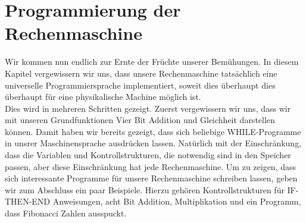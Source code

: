 \documentclass[11pt,a4paper,leqno]{report}
\numberwithin{equation}{chapter}
\begin{document}
\chapter{Programmierung der Rechenmaschine}
Wir kommen nun endlich zur Ernte der Früchte unserer Bemühungen. In diesem Kapitel vergewissern wir uns, dass unsere Rechenmaschine tats\"achlich eine universelle Programmiersprache implementiert, soweit dies \"uberhaupt dies \"uberhaupt f\"ur eine physikalische Machine m\"oglich ist.\\
Dies wird in mehreren Schritten gezeigt. Zuerst vergewissern wir uns, dass wir mit unseren Grundfunktionen Vier Bit Addition und Gleichheit darstellen k\"onnen. Damit haben wir bereits gezeigt, dass sich beliebige WHILE-Programme in unsrer Maschinensprache ausdr\"ucken lassen. Nat\"urlich mit der Einschr\"ankung, dass die Variablen und Kontrollstrukturen, die notwendig sind in den Speicher passen, aber diese Einschr\"ankung hat jede Rechenmaschine. Um zu zeigen, dass sich interessante Programme f\"ur unsere Rechenmaschine schreiben lassen, geben wir zum Abschluss ein paar Beispiele. Hierzu geh\"oren Kontrollstrukturen f\"ur IF-THEN-END Anweisungen, acht Bit Addition, Multiplikation und ein Programm, dass Fibonacci Zahlen ausspuckt.
\end{document}
